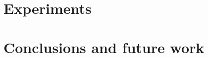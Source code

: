 \documentclass[12pt]{scrartcl}
\begin{document}
\section{Experiments}\label{sec:experiments}
% 


\section{Conclusions and future work}\label{sec:conclusions}




\end{document}
